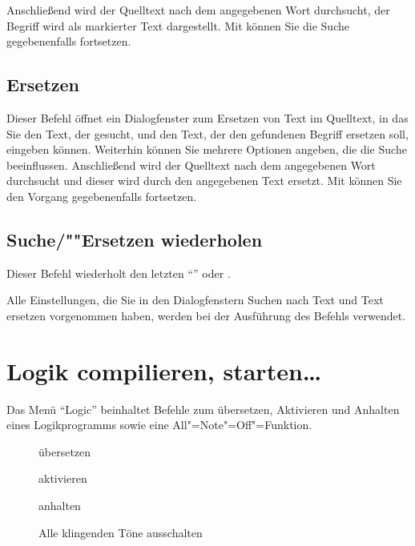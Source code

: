 Anschließend wird der Quelltext nach dem angegebenen Wort durchsucht,
der Begriff wird als markierter Text dargestellt. Mit
 können Sie die Suche
gegebenenfalls fortsetzen.



\subsection{Ersetzen}\label{sec:MI_REPLACE}

Dieser Befehl öffnet ein Dialogfenster zum Ersetzen von Text 
im Quelltext, in das Sie den Text, der gesucht, und den Text, 
der den gefundenen Begriff ersetzen soll, eingeben können. 
Weiterhin können Sie mehrere Optionen angeben, die die Suche 
beeinflussen. Anschließend wird der Quelltext nach dem angegebenen 
Wort durchsucht und dieser wird durch den angegebenen Text ersetzt. 
Mit  können Sie den 
Vorgang gegebenenfalls fortsetzen.


\subsection{Suche/""Ersetzen wiederholen}
\label{sec:MI_NEXT}

Dieser Befehl wiederholt den letzten "`"'
oder .



Alle Einstellungen, die Sie in den Dialogfenstern Suchen nach 
Text und Text ersetzen vorgenommen haben, werden bei der Ausführung 
des Befehls verwendet. 


\section{Logik compilieren, starten\dots}\label{sec:MS_LOGIC}

Das Menü "`Logic"' beinhaltet Befehle zum übersetzen, Aktivieren 
und Anhalten eines Logikprogramms sowie eine All"=Note"=Off"=Funktion.


\begin{description}
\item[]
   übersetzen
\item[]
   aktivieren
\item[]
   anhalten 
\item[] Alle klingenden Töne ausschalten
\end{description}

